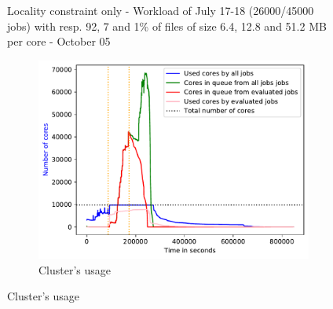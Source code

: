 \documentclass[a4paper]{article}
\begin{document}
\begin{figure}[H]
\caption{Locality constraint only - Workload of July 17-18 (26000/45000 jobs) with resp. 92, 7 and 1\% of files of size 6.4, 12.8 and 51.2 MB per core - October 05}\end{figure}

\begin{figure}[H]\centering
\begin{subfigure}[b]{0.4\linewidth}\centering\includegraphics[width=1\linewidth]{MBSS/plot/2022-08-16->2022-08-16_V9271_Fcfs_Used_nodes_450_128_32_256_4_1024.pdf}\caption{Cluster's usage}\end{subfigure}

\end{figure}
\end{document}
